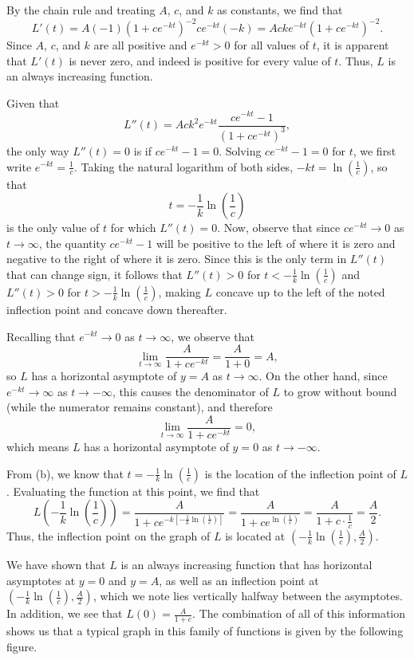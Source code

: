 \begin{activitySolution}
	 \ba
		\item By the chain rule and treating $A$, $c$, and $k$ as constants, we find that
		$$L'(t) = A(-1)(1+ce^{-kt})^{-2} ce^{-kt}(-k) = Acke^{-kt}(1+ce^{-kt})^{-2}.$$  
		Since $A$, $c$, and $k$ are all positive and $e^{-kt} > 0$ for all values of $t$, it is apparent that $L'(t)$ is never zero, and indeed is positive for every value of $t$.  Thus, $L$ is an always increasing function.
	 	\item  Given that
		$$L''(t) = Ack^2e^{-kt} \frac{ce^{-kt}-1}{(1+ce^{-kt})^3},$$ the only way $L''(t) = 0$ is if $ce^{-kt}-1 = 0$.  Solving $ce^{-kt}-1 = 0$ for $t$, we first write $e^{-kt} = \frac{1}{c}$.  Taking the natural logarithm of both sides, $-kt = \ln(\frac{1}{c})$, so that
		$$t = -\frac{1}{k} \ln \left(\frac{1}{c}\right)$$
		is the only value of $t$ for which $L''(t) = 0$.  Now, observe that since $ce^{-kt} \to 0$ as $t \to \infty$, the quantity $ce^{-kt} - 1$ will be positive to the left of where it is zero and negative to the right of where it is zero.  Since this is the only term in $L''(t)$ that can change sign, it follows that $L''(t) > 0$ for $t < -\frac{1}{k} \ln \left(\frac{1}{c}\right)$ and $L''(t) > 0$ for $t > -\frac{1}{k} \ln \left(\frac{1}{c}\right)$, making $L$ concave up to the left of the noted inflection point and concave down thereafter.
		\item Recalling that $e^{-kt} \to 0$ as $t \to \infty$, we observe that
		 $$\lim_{t \to \infty} \frac{A}{1+ce^{-kt}} = \frac{A}{1+0} = A,$$
		 so $L$ has a horizontal asymptote of $y = A$ as $t \to \infty$.  On the other hand, since $e^{-kt} \to \infty$ as $t \to -\infty$, this causes the denominator of $L$ to grow without bound (while the numerator remains constant), and therefore
		 		 $$\lim_{t \to \infty} \frac{A}{1+ce^{-kt}} = 0,$$
				 which means $L$ has a horizontal asymptote of $y = 0$ as $t \to -\infty$.
		\item From (b), we know that $t = -\frac{1}{k} \ln \left(\frac{1}{c}\right)$ is the location of the inflection point of $L$.  Evaluating the function at this point, we find that
		$$L\left( -\frac{1}{k} \ln \left(\frac{1}{c}\right) \right) = \frac{A}{1+ce^{-k [-\frac{1}{k} \ln \left(\frac{1}{c}\right)]}} = \frac{A}{1+ce^{\ln \left(\frac{1}{c}\right)}} = \frac{A}{1+c \cdot \frac{1}{c}} = \frac{A}{2}.$$
		Thus, the inflection point on the graph of $L$ is located at  $( -\frac{1}{k} \ln \left(\frac{1}{c}\right), \frac{A}{2})$.
	  	\item We have shown that $L$ is an always increasing function that has horizontal asymptotes at $y =0$ and $y = A$, as well as an inflection point at $( -\frac{1}{k} \ln \left(\frac{1}{c}\right), \frac{A}{2})$, which we note lies vertically halfway between the asymptotes.  In addition, we see that $L(0) = \frac{A}{1+c}$.  The combination of all of this information shows us that a typical graph in this family of functions is given by the following figure.

\end{activitySolution}
